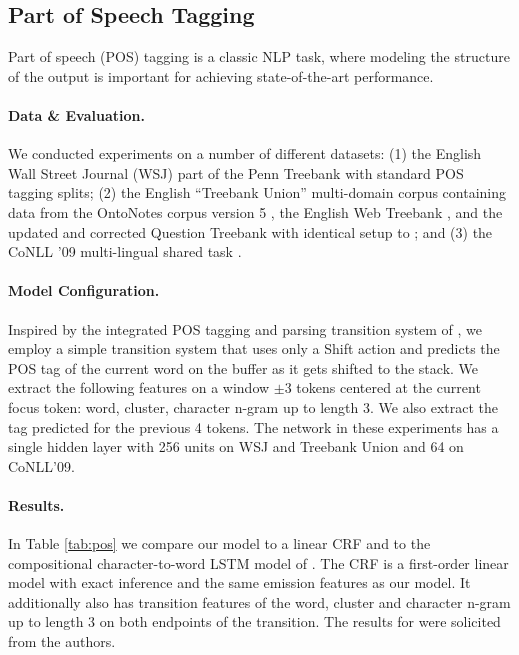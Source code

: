 \subsection{Part of Speech Tagging}
\label{subsection:tagging}

Part of speech (POS) tagging is a classic NLP task,
where modeling the structure of the output
is important for achieving state-of-the-art performance.

\paragraph{Data \& Evaluation.}

We conducted experiments on a number of different datasets:
(1) the English Wall Street Journal (WSJ) part
of the Penn Treebank \cite{marcus:1993:CL}
with standard POS tagging splits;
(2) the English ``Treebank Union'' multi-domain corpus containing
data from the OntoNotes corpus version 5 \cite{hovy-EtAl:2006:NAACL},
the English Web Treebank \cite{petrov-mcdonald:2012:SANCL}, and the
updated and corrected Question Treebank \cite{judge-etAl:2006:ACL}
with identical setup to ; and
(3) the CoNLL '09 multi-lingual shared 
task \cite{hajic-EtAl:2009:CoNLL}.%

\paragraph{Model Configuration.}

Inspired by the integrated POS tagging and parsing transition 
system of , 
we employ a simple transition system that uses only a {\sc Shift} action and 
predicts the POS tag of the current word on the buffer
as it gets shifted to the stack. 
We extract the following features on a window $\pm 3$ tokens centered
at the current focus token: word, cluster, character n-gram up to length 3.
We also extract the tag predicted for the previous 4 tokens.
The network in these experiments has a single hidden layer with
256 units on WSJ and Treebank Union and 64 on CoNLL'09.

\paragraph{Results.}

In Table \ref{tab:pos} we compare our model
to a linear CRF and to the compositional
character-to-word LSTM model of .
The CRF is a first-order linear model with exact inference and
the same emission features as our model. It additionally also
has transition features of the
word, cluster and character n-gram up to length 3 on both endpoints of the
transition.
The results for 
were solicited from the authors.

